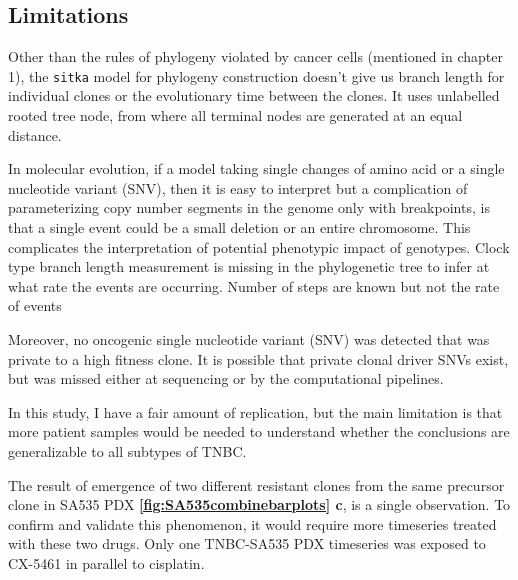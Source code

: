 \subsection{Limitations}

Other than the rules of phylogeny violated by cancer cells (mentioned in chapter 1), the \texttt{sitka} model for phylogeny construction doesn't give us branch length for individual clones or the evolutionary time between the clones. It  uses unlabelled rooted tree node, from where all terminal nodes are generated at an equal distance. 
 
 In molecular evolution, if a model taking single changes of amino acid or a single nucleotide variant (SNV), then it is easy to interpret but a complication of parameterizing copy number segments in the genome only with breakpoints, is that a single event could be a small deletion or an entire chromosome. This complicates the interpretation of potential phenotypic impact of genotypes. 
 Clock type branch length measurement is missing in the phylogenetic tree to infer at what rate the events are occurring. Number of steps are known but not the rate of events

Moreover, no oncogenic single nucleotide variant (SNV) was detected that was private to a high fitness clone.
It is possible that private clonal driver SNVs exist, but was missed either at sequencing or by the computational pipelines.

 
In this study, I have a fair amount of replication, but the main limitation is that more patient samples would be needed to understand whether the conclusions are generalizable to all subtypes of TNBC.


The result of emergence of two different resistant clones from the same precursor clone in SA535 PDX \textbf{\autoref{fig:SA535combinebarplots} c}, is a single observation. To confirm and validate this phenomenon, it would require more timeseries treated with these two drugs. Only one TNBC-SA535 PDX timeseries was exposed to CX-5461 in parallel to cisplatin. 





